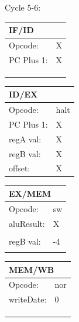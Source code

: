 \documentclass[12pt, letterpaper]{article}
\begin{document}
Cycle 5-6:
\begin{table}[H]
    \begin{tabular}{|ll|}
    \hline
    \multicolumn{2}{|l|}{IF/ID}            \\ \hline
    \multicolumn{1}{|l|}{Opcode:}    & X \\ \hline
    \multicolumn{1}{|l|}{PC Plus 1:} & X   \\ \hline
    \multicolumn{1}{|l|}{}           &     \\ \hline
    \multicolumn{1}{|l|}{}           &     \\ \hline
    \multicolumn{1}{|l|}{}           &     \\ \hline
    \end{tabular}
    \begin{tabular}{|ll|}
    \hline
    \multicolumn{2}{|l|}{ID/EX}             \\ \hline
    \multicolumn{1}{|l|}{Opcode:}    & halt \\ \hline
    \multicolumn{1}{|l|}{PC Plus 1:} & X    \\ \hline
    \multicolumn{1}{|l|}{regA val:}  & X    \\ \hline
    \multicolumn{1}{|l|}{regB val:}  & X    \\ \hline
    \multicolumn{1}{|l|}{offset:}    & X    \\ \hline
    \end{tabular}
    \begin{tabular}{|ll|}
    \hline
    \multicolumn{2}{|l|}{EX/MEM}            \\ \hline
    \multicolumn{1}{|l|}{Opcode:}    & sw \\ \hline
    \multicolumn{1}{|l|}{aluResult:} & X    \\ \hline
    \multicolumn{1}{|l|}{}           &      \\ \hline
    \multicolumn{1}{|l|}{regB val:}  & -4    \\ \hline
    \multicolumn{1}{|l|}{}           &      \\ \hline
    \end{tabular}
    \begin{tabular}{|ll|}
    \hline
    \multicolumn{2}{|l|}{MEM/WB}            \\ \hline
    \multicolumn{1}{|l|}{Opcode:}    & nor \\ \hline
    \multicolumn{1}{|l|}{writeDate:} & 0    \\ \hline
    \multicolumn{1}{|l|}{}           &      \\ \hline
    \multicolumn{1}{|l|}{}           &      \\ \hline
    \multicolumn{1}{|l|}{}           &      \\ \hline
    \end{tabular}
\end{table}
\end{document}
